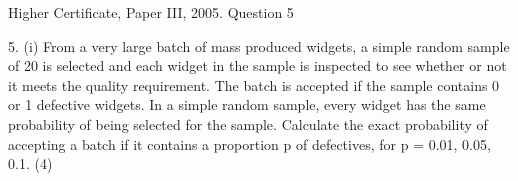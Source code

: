 \documentclass[a4paper,12pt]{article}
\begin{document}
Higher Certificate, Paper III, 2005. Question 5
\begin{framed}
5.
(i)
From a very large batch of mass produced widgets, a simple random sample of 20 is selected and each widget in the sample is inspected to see whether or not
it meets the quality requirement. The batch is accepted if the sample contains 0 or 1 defective widgets.
In a simple random sample, every widget has the same probability of being selected for the sample. Calculate the exact probability of accepting a batch if
it contains a proportion p of defectives, for p = 0.01, 0.05, 0.1.
(4)

\end{framed}


\end{document}
